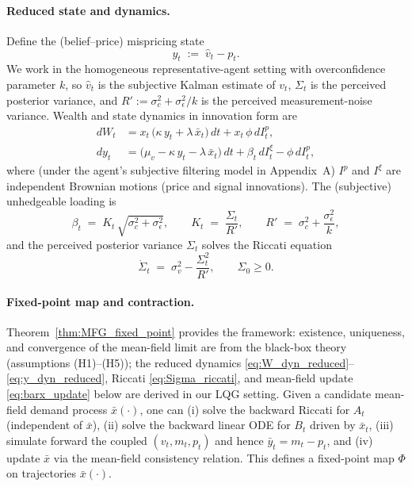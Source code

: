 \paragraph{Reduced state and dynamics.}
Define the (belief--price) mispricing state
\begin{equation}
y_t \;:=\; \hat v_t - p_t.
\label{eq:y_reduced}
\end{equation}
We work in the homogeneous representative-agent setting with overconfidence parameter $k$, so $\hat v_t$ is the subjective Kalman estimate of $v_t$, $\Sigma_t$ is the perceived posterior variance, and $R':=\sigma_c^2+\sigma_\epsilon^2/k$ is the perceived measurement-noise variance. Wealth and state dynamics in innovation form are
\begin{align}
dW_t
&= x_t\,\bigl(\kappa\,y_t + \lambda\,\bar x_t\bigr)\,dt + x_t\,\phi\,dI^p_t,
\label{eq:W_dyn_reduced}\\
dy_t
&= \bigl(\mu_v - \kappa\,y_t - \lambda\,\bar x_t\bigr)\,dt + \beta_t\,dI^\xi_t - \phi\,dI^p_t,
\label{eq:y_dyn_reduced}
\end{align}
where (under the agent's subjective filtering model in Appendix~A) $I^p$ and $I^\xi$ are independent Brownian motions (price and signal innovations). The (subjective) unhedgeable loading is
\begin{equation}
\beta_t \;=\; K_t\,\sqrt{\sigma_c^2+\sigma_\epsilon^2},\qquad
K_t \;=\; \frac{\Sigma_t}{R'},\qquad
R' \;=\; \sigma_c^2 + \frac{\sigma_\epsilon^2}{k},
\label{eq:beta_K_R}
\end{equation}
and the perceived posterior variance $\Sigma_t$ solves the Riccati equation
\begin{equation}
\dot\Sigma_t \;=\; \sigma_v^2 - \frac{\Sigma_t^2}{R'},\qquad \Sigma_0\ge 0.
\label{eq:Sigma_riccati}
\end{equation}

\paragraph{Fixed-point map and contraction.}
Theorem~\ref{thm:MFG_fixed_point} provides the framework: existence, uniqueness, and convergence of the mean-field limit are from the black-box theory (assumptions (H1)--(H5)); the reduced dynamics \eqref{eq:W_dyn_reduced}--\eqref{eq:y_dyn_reduced}, Riccati \eqref{eq:Sigma_riccati}, and mean-field update \eqref{eq:barx_update} below are derived in our LQG setting. Given a candidate mean-field demand process $\bar x(\cdot)$, one can (i) solve the backward Riccati for $A_t$ (independent of $\bar x$), (ii) solve the backward linear ODE for $B_t$ driven by $\bar x_t$, (iii) simulate forward the coupled $(v_t,m_t,p_t)$ and hence $\bar y_t = m_t - p_t$, and (iv) update $\bar x$ via the mean-field consistency relation. This defines a fixed-point map $\Phi$ on trajectories $\bar x(\cdot)$.

